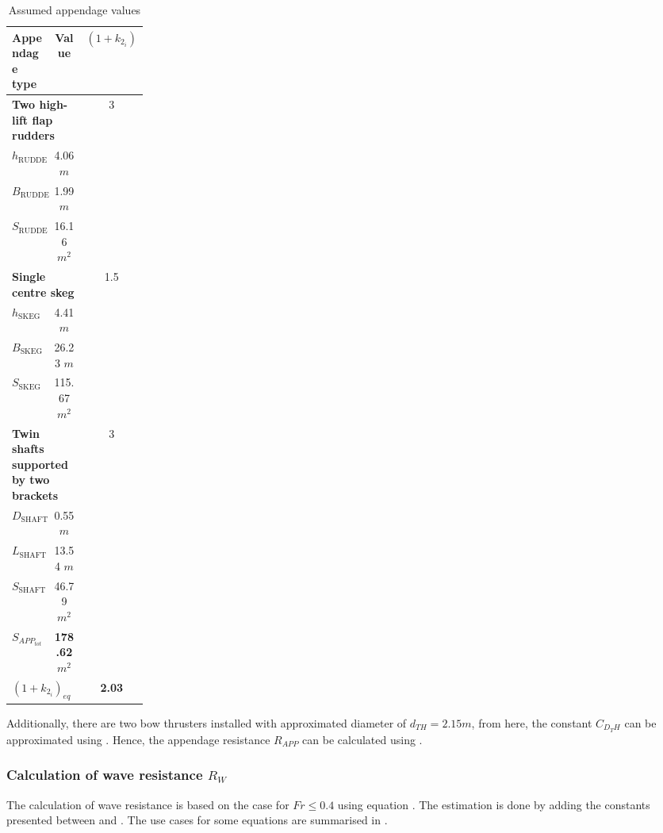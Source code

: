 \begin{table}[h]
    \footnotesize
    \centering
    {\begin{tabular}{ p{0.2\linewidth} c c}
    \hline
    Appendage type & Value & $(1+k_{2_i})$ \\
    \hline
    \multicolumn{2}{l}{\textbf{Two high-lift flap rudders}} & 3\\
    \hline
    $h_{\text{RUDDER}}$ & 4.06 $m$\\
    $B_{\text{RUDDER}}$ & 1.99 $m$\\
    $S_{\text{RUDDER}}$ & 16.16 $m^2$\\
    \hline
    \multicolumn{2}{l}{\textbf{Single centre skeg}} & 1.5\\
    \hline
    $h_{\text{SKEG}}$ & 4.41 $m$\\
    $B_{\text{SKEG}}$ & 26.23 $m$\\
    $S_{\text{SKEG}}$ & 115.67 $m^2$\\
    \hline
    \multicolumn{2}{l}{\textbf{Twin shafts supported by two brackets}} & 3\\
    \hline
    $D_{\text{SHAFT}}$ & 0.55 $m$\\
    $L_{\text{SHAFT}}$ & 13.54 $m$\\
    $S_{\text{SHAFT}}$ & 46.79 $m^2$\\
    \hline
    \multicolumn{1}{l}{\textbf{$S_{APP_{tot}}$}} & \textbf{178.62} $m^2$ \\
    \multicolumn{2}{l}{\textbf{$(1+k_{2_i})_{eq}$}} & \textbf{2.03} \\
    \end{tabular}}
\caption{Assumed appendage values}\label{tbl:assume_appendage_dimension}
\end{table}

Additionally, there are two bow thrusters installed with approximated diameter of $d_{TH}= 2.15 m$, from here, the constant $C_{D_TH}$ can be approximated using . Hence, the appendage resistance $R_{APP}$ can be calculated using .

\subsubsection*{Calculation of wave resistance $R_{W}$}

The calculation of wave resistance is based on the case for $Fr \leq 0.4$ using equation . The estimation is done by adding the constants presented between  and . The use cases for some equations are summarised in .

